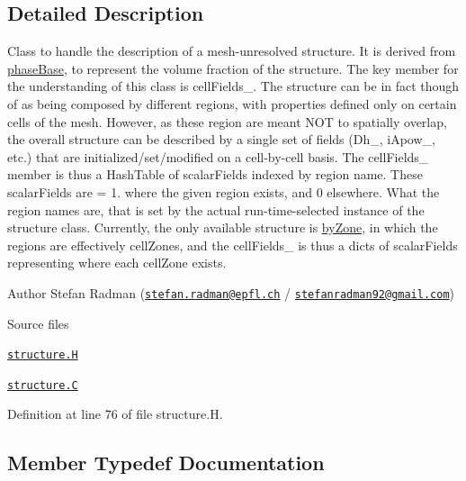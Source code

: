 \subsection{Detailed Description}
Class to handle the description of a mesh-\/unresolved structure. It is derived from \hyperlink{classFoam_1_1phaseBase}{phase\+Base}, to represent the volume fraction of the structure. The key member for the understanding of this class is cell\+Fields\+\_\+. The structure can be in fact though of as being composed by different regions, with properties defined only on certain cells of the mesh. However, as these region are meant N\+OT to spatially overlap, the overall structure can be described by a single set of fields (Dh\+\_\+, i\+Apow\+\_\+, etc.) that are initialized/set/modified on a cell-\/by-\/cell basis. The cell\+Fields\+\_\+ member is thus a Hash\+Table of scalar\+Fields indexed by region name. These scalar\+Fields are = 1. where the given region exists, and 0 elsewhere. What the region names are, that is set by the actual run-\/time-\/selected instance of the structure class. Currently, the only available structure is \hyperlink{classFoam_1_1byZone}{by\+Zone}, in which the regions are effectively cell\+Zones, and the cell\+Fields\+\_\+ is thus a dicts of scalar\+Fields representing where each cell\+Zone exists. 

\label{_Description}%
 Author Stefan Radman (\href{mailto:stefan.radman@epfl.ch}{\tt stefan.\+radman@epfl.\+ch} / \href{mailto:stefanradman92@gmail.com}{\tt stefanradman92@gmail.\+com})

\begin{DoxyParagraph}{Source files}

\begin{DoxyItemize}
\item \href{../../../home/carlo/data/GeN-Foam/GeN-Foam_ffn/GeN-Foam/GeN-Foam/classes/thermalHydraulics/src/phaseModels/structureModels/structure.H}{\tt structure.\+H} 
\item \href{../../../home/carlo/data/GeN-Foam/GeN-Foam_ffn/GeN-Foam/GeN-Foam/classes/thermalHydraulics/src/phaseModels/structureModels/structure.C}{\tt structure.\+C} 
\end{DoxyItemize}
\end{DoxyParagraph}


Definition at line 76 of file structure.\+H.



\subsection{Member Typedef Documentation}
\mbox{\label{classFoam_1_1structure_afefd20eeb8d2675bfba9c1ce9aa78ca7}} 
